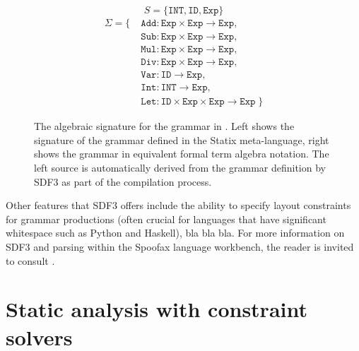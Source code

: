 \begin{figure}
  \centering
  \begin{subfigure}{.45\textwidth}
    \centering
    \usebox{\sdfsignaturebox}
  \end{subfigure}\hfill%
  \begin{subfigure}{.5\textwidth}
    \centering
    $$ S = \{\texttt{INT}, \texttt{ID}, \texttt{Exp}\} $$
    \begin{equation*}
    \begin{aligned}
    \Sigma = \{ \; & \texttt{Add} : \texttt{Exp} \times \texttt{Exp} \to \texttt{Exp}, \\
                  & \texttt{Sub} : \texttt{Exp} \times \texttt{Exp} \to \texttt{Exp}, \\
                  & \texttt{Mul} : \texttt{Exp} \times \texttt{Exp} \to \texttt{Exp}, \\
                  & \texttt{Div} : \texttt{Exp} \times \texttt{Exp} \to \texttt{Exp}, \\
                  & \texttt{Var} : \texttt{ID} \to \texttt{Exp}, \\
                  & \texttt{Int} : \texttt{INT} \to \texttt{Exp}, \\
                  & \texttt{Let} : \texttt{ID} \times \texttt{Exp} \times \texttt{Exp} \to \texttt{Exp} \; \}
    \end{aligned}
    \end{equation*}
  \end{subfigure}
  \caption{The algebraic signature for the grammar in . Left shows the signature of the grammar defined in the Statix meta-language, right shows the grammar in equivalent formal term algebra notation. The left source is automatically derived from the grammar definition by SDF3 as part of the compilation process.}
  \label{fig:sdf3_example_signature}
\end{figure}

Other features that SDF3 offers include the ability to specify layout constraints for grammar productions (often crucial for languages that have significant whitespace such as Python and Haskell), bla bla bla. For more information on SDF3 and parsing within the Spoofax language workbench, the reader is invited to consult \cite{KatsV10a, Spoofax2021, Amorim2019, AmorimV20,KallebergV07, WachsmuthKV14}.

\section{\label{sec:spoofax_constraint}Static analysis with constraint solvers}

